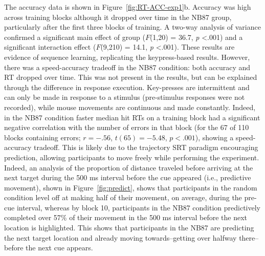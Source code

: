 \documentclass[man,floatsintext]{apa6}
\begin{document}
The accuracy data is shown in Figure~\ref{fig:RT-ACC-exp1}b. Accuracy was high across training blocks although it dropped over time in the NB87 group, particularly after the first three blocks of training.  A two-way analysis of variance confirmed a significant main effect of group ($F$(1,20) = 36.7, \textit{p} \textless .001) and a significant interaction effect ($F$(9,210) = 14.1, \textit{p} \textless .001). These results are evidence of sequence learning, replicating the  keypress-based results. However, there was a speed-accuracy tradeoff in the NB87 condition: both accuracy and RT dropped over time. This was not present in the  results, but can be explained through the difference in response execution. Key-presses are intermittent and can only be made in response to a stimulus (pre-stimulus responses were not recorded), while mouse movements are continuous and made constantly. Indeed, in the NB87 condition faster median hit RTs on a training block had a significant negative correlation with the number of errors in that block (for the 67 of 110 blocks containing errors; $r=-.56$, $t(65)=-5.48$, $p<.001$), showing a speed-accuracy tradeoff. This is likely due to the trajectory SRT paradigm encouraging prediction, allowing participants to move freely while performing the experiment. Indeed, an analysis of the proportion of distance traveled before arriving at the next target during the 500 ms interval before the cue appeared (i.e., predictive movement), shown in Figure~\ref{fig:predict}, shows that participants in the random condition level off at making half of their movement, on average, during the pre-cue interval, whereas by block 10, participants in the NB87 condition predictively completed over 57\% of their movement in the 500 ms interval before the next location is highlighted. This shows that participants in the NB87 are predicting the next target location and already moving towards--getting over halfway there--before the next cue appears.


\end{document}
